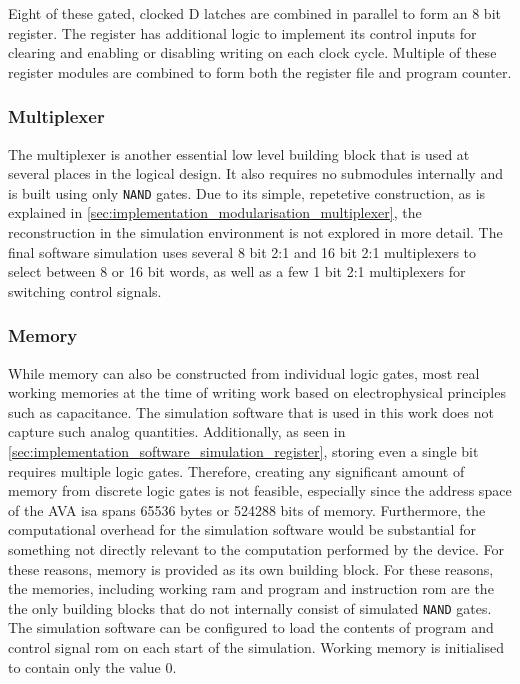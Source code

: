 Eight of these gated, clocked D latches are combined in parallel to form an 8 bit register. The register has additional logic to implement its control inputs for clearing and enabling or disabling writing on each clock cycle. Multiple of these register modules are combined to form both the register file and program counter.

\subsubsection{Multiplexer}

The multiplexer is another essential low level building block that is used at several places in the logical design. It also requires no submodules internally and is built using only \texttt{NAND} gates. Due to its simple, repetetive construction, as is explained in \autoref{sec:implementation_modularisation_multiplexer}, the reconstruction in the simulation environment is not explored in more detail. The final software simulation uses several 8 bit 2:1 and 16 bit 2:1 multiplexers to select between 8 or 16 bit words, as well as a few 1 bit 2:1 multiplexers for switching control signals.

\subsubsection{Memory}

While memory can also be constructed from individual logic gates, most real working memories at the time of writing work based on electrophysical principles such as capacitance. The simulation software that is used in this work does not capture such analog quantities. Additionally, as seen in \autoref{sec:implementation_software_simulation_register}, storing even a single bit requires multiple logic gates. Therefore, creating any significant amount of memory from discrete logic gates is not feasible, especially since the address space of the AVA \ac{isa} spans 65536 bytes or 524288 bits of memory. Furthermore, the computational overhead for the simulation software would be substantial for something not directly relevant to the computation performed by the device. For these reasons, memory is provided as its own building block. For these reasons, the memories, including working \ac{ram} and program and instruction \ac{rom} are the the only building blocks that do not internally consist of simulated \texttt{NAND} gates. The simulation software can be configured to load the contents of program and control signal \ac{rom} on each start of the simulation. Working memory is initialised to contain only the value 0.

